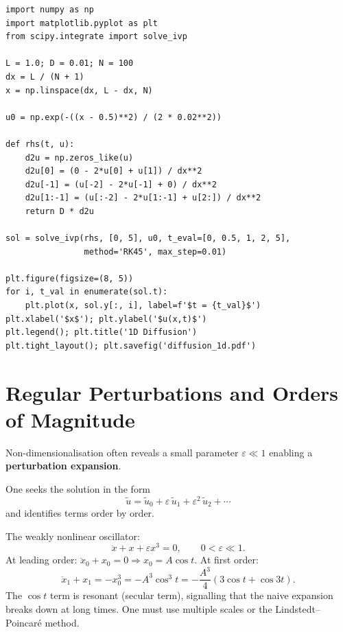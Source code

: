 \begin{codeblock}[title=\textbf{Diffusion time in Python}]
\begin{verbatim}
import numpy as np
import matplotlib.pyplot as plt
from scipy.integrate import solve_ivp

L = 1.0; D = 0.01; N = 100
dx = L / (N + 1)
x = np.linspace(dx, L - dx, N)

u0 = np.exp(-((x - 0.5)**2) / (2 * 0.02**2))

def rhs(t, u):
    d2u = np.zeros_like(u)
    d2u[0] = (0 - 2*u[0] + u[1]) / dx**2
    d2u[-1] = (u[-2] - 2*u[-1] + 0) / dx**2
    d2u[1:-1] = (u[:-2] - 2*u[1:-1] + u[2:]) / dx**2
    return D * d2u

sol = solve_ivp(rhs, [0, 5], u0, t_eval=[0, 0.5, 1, 2, 5],
                method='RK45', max_step=0.01)

plt.figure(figsize=(8, 5))
for i, t_val in enumerate(sol.t):
    plt.plot(x, sol.y[:, i], label=f'$t = {t_val}$')
plt.xlabel('$x$'); plt.ylabel('$u(x,t)$')
plt.legend(); plt.title('1D Diffusion')
plt.tight_layout(); plt.savefig('diffusion_1d.pdf')
\end{verbatim}
\end{codeblock}

\section{Regular Perturbations and Orders of Magnitude}
\label{sec:perturbations}

Non-dimensionalisation often reveals a small parameter
$\varepsilon\ll 1$ enabling a \textbf{perturbation expansion}.

\begin{definition}
One seeks the solution in the form
\[
  \tilde{u} = \tilde{u}_0 + \varepsilon\,\tilde{u}_1
             + \varepsilon^2\,\tilde{u}_2 + \cdots
\]
and identifies terms order by order.
\end{definition}

\begin{example}
The weakly nonlinear oscillator:
\[
  \ddot{x} + x + \varepsilon x^3 = 0, \qquad 0<\varepsilon\ll 1.
\]
At leading order: $\ddot{x}_0 + x_0 = 0 \Rightarrow x_0 = A\cos t$.
At first order:
\[
  \ddot{x}_1 + x_1 = -x_0^3 = -A^3\cos^3 t
  = -\frac{A^3}{4}(3\cos t + \cos 3t).
\]
The $\cos t$ term is resonant (secular term), signalling that the
naive expansion breaks down at long times.  One must use multiple
scales or the Lindstedt--Poincar\'e method.
\end{example}

